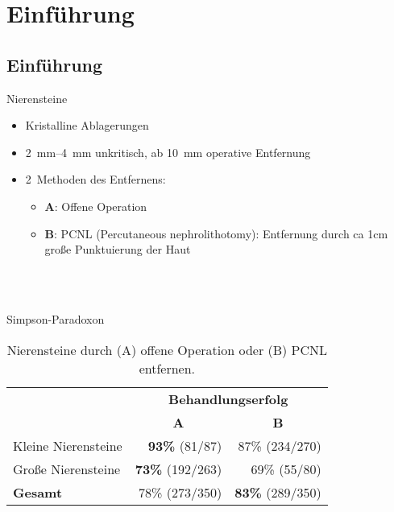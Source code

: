 \section{Einführung}
\subsection{Einführung}
\begin{frame}{Nierensteine}
    \begin{itemize}
        \item Kristalline Ablagerungen
        \item \SIrange{2}{4}{\milli\meter} unkritisch,
              ab \SI{10}{\milli\meter} operative Entfernung
        \item 2~Methoden des Entfernens:
        \begin{itemize}
            \item \textbf{A}: Offene Operation
            \item \textbf{B}: PCNL (Percutaneous nephrolithotomy): Entfernung
                  durch ca 1cm große Punktuierung der Haut
        \end{itemize}
    \end{itemize}

    \\
    \\
\end{frame}


\begin{frame}{Simpson-Paradoxon}
    \begin{table}
        \begin{tabular}{lrr}
        \toprule
        ~      & \multicolumn{2}{c}{\textbf{Behandlungserfolg}}  \\
        \cmidrule{2-3}
        ~                   & \multicolumn{1}{c}{\textbf{A}} & \multicolumn{1}{c}{\textbf{B}} \\ \midrule
        Kleine Nierensteine & \textbf{93\%}  (\hphantom{0}81/\hphantom{0}87)  & 87\% (234/270) \\
        Große Nierensteine  & \textbf{73\%} (192/263) & 69\% (\hphantom{0}55/\hphantom{0}80)\\
        \textbf{Gesamt}     & 78\% (273/350)          & \textbf{83\%} (289/350) \\
        \bottomrule
        \end{tabular}
        \caption{Nierensteine durch (A) offene Operation oder (B) PCNL entfernen.}
        \label{table:countries}
    \end{table}

\end{frame}


